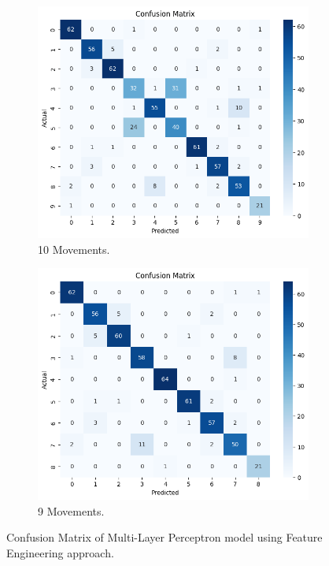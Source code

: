             \begin{figure}[h]
                \begin{subfigure}{.5\textwidth}
                \centering
                  \includegraphics[width=1.\linewidth]{../src/resources/plots/conf-matrix/fe.png}
                  \caption{10 Movements.}
                  \label{fig:cm_all}
                \end{subfigure}%
                \begin{subfigure}{.5\textwidth}
                \centering
                  \includegraphics[width=1.\linewidth]{../src/resources/plots/conf-matrix/fe-remove.png}
                  \caption{9 Movements.}
                  \label{fig:cm_remove}
                \end{subfigure}
                \caption{Confusion Matrix of Multi-Layer Perceptron model using Feature Engineering approach.}
            \end{figure}
            
